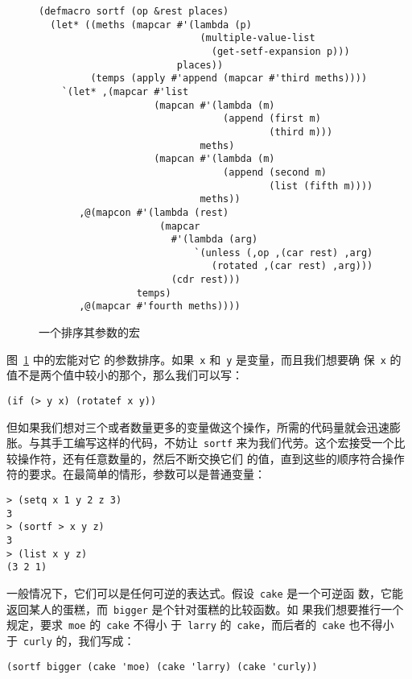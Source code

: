 \begin{figure}
\begin{lstlisting}
(defmacro sortf (op &rest places)
  (let* ((meths (mapcar #'(lambda (p)
                            (multiple-value-list
                              (get-setf-expansion p)))
                        places))
         (temps (apply #'append (mapcar #'third meths))))
    `(let* ,(mapcar #'list
                    (mapcan #'(lambda (m)
                                (append (first m)
                                        (third m)))
                            meths)
                    (mapcan #'(lambda (m)
                                (append (second m)
                                        (list (fifth m))))
                            meths))
       ,@(mapcon #'(lambda (rest)
                     (mapcar
                       #'(lambda (arg)
                           `(unless (,op ,(car rest) ,arg)
                              (rotated ,(car rest) ,arg)))
                       (cdr rest)))
                 temps)
       ,@(mapcar #'fourth meths))))
\end{lstlisting}
  \caption{一个排序其参数的宏}
  \label{fig:a_macro_which_sorts_its_arguments}
\end{figure}

图~\ref{fig:a_macro_which_sorts_its_arguments} 中的宏能对它
的参数排序。如果~\verb|x| 和~\verb|y| 是变量，而且我们想要确
保~\verb|x| 的值不是两个值中较小的那个，那么我们可以写：
\begin{lstlisting}
(if (> y x) (rotatef x y))
\end{lstlisting}
但如果我们想对三个或者数量更多的变量做这个操作，所需的代码量就会迅速膨胀。与其手工编写这样的代码，不妨让~\verb|sortf| 来为我们代劳。这个宏接受一个比较操作符，还有任意数量的\gv{}，然后不断交换它们
的值，直到这些\gv{}的顺序符合操作符的要求。在最简单的情形，参数可以是普通变量：
\begin{lstlisting}
> (setq x 1 y 2 z 3)
3
> (sortf > x y z)
3
> (list x y z)
(3 2 1)
\end{lstlisting}
一般情况下，它们可以是任何可逆的表达式。假设~\verb|cake| 是一个可逆函
数，它能返回某人的蛋糕，而~\verb|bigger| 是个针对蛋糕的比较函数。如
果我们想要推行一个规定，要求~\verb|moe| 的~\verb|cake| 不得小
于~\verb|larry| 的~\verb|cake|，而后者的~\verb|cake| 也不得小
于~\verb|curly| 的，我们写成：
\begin{lstlisting}
(sortf bigger (cake 'moe) (cake 'larry) (cake 'curly))
\end{lstlisting}

